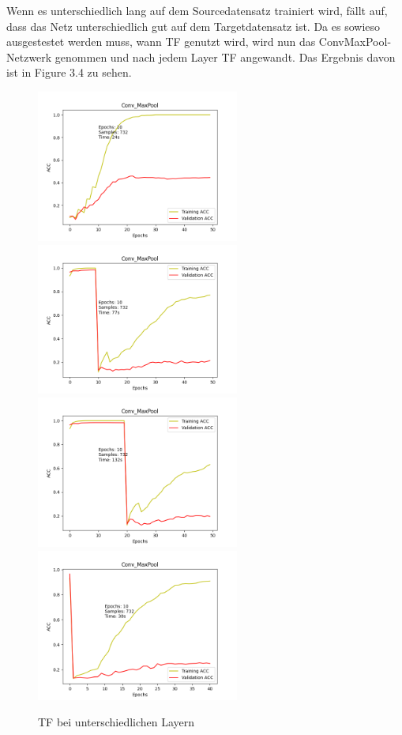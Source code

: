 Wenn es unterschiedlich lang auf dem Sourcedatensatz trainiert wird, fällt auf, dass das Netz unterschiedlich gut auf dem Targetdatensatz ist. 
Da es sowieso ausgestestet werden muss, wann TF genutzt wird, wird nun das ConvMaxPool-Netzwerk genommen und nach jedem Layer TF angewandt. 
Das Ergebnis davon ist in Figure 3.4 zu sehen. 

\begin{figure}[htpb]
    \includegraphics[height=5cm]{../../Plots/ba_plots/convmaxpool/wotr.png}
    \includegraphics[height=5cm]{../../Plots/ba_plots/convmaxpool/1TFtr.png}
    \includegraphics[height=5cm]{../../Plots/ba_plots/convmaxpool/2TFtr.png}
    \includegraphics[height=5cm]{../../Plots/ba_plots/convmaxpool/epochTFtr.png}
    \caption{\label{fig:layertf} TF bei unterschiedlichen Layern}
\end{figure}

